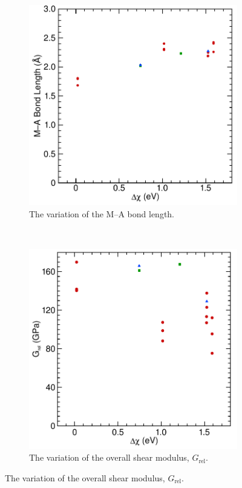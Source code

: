 \begin{figure}
\begin{subfigure}{0.4\textwidth}
\centering
{}
\includegraphics[width=\textwidth]{dma_vs_dX}
\caption{The variation of the M--A bond length. \label{fig:bond_length}}
\end{subfigure}
~
\begin{subfigure}{0.4\textwidth}
\centering
{}
\includegraphics[width=\textwidth]{Grel_vs_dX}
\caption{The variation of the overall shear modulus, $G_{\text{rel}}$. \label{fig:overall_G_vs_dX}}
\end{subfigure}


\end{figure}
